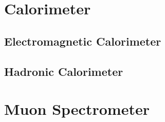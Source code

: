 
\section{Calorimeter}


\subsection{Electromagnetic Calorimeter}

\subsection{Hadronic Calorimeter}

\section{Muon Spectrometer}


